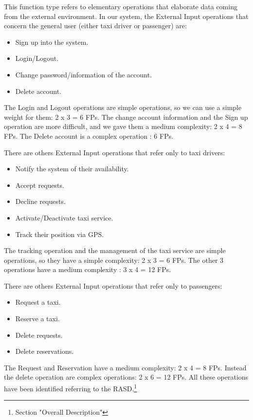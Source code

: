 This function type refers to elementary operations that elaborate data coming from the external environment.
\newline
In our system, the External Input operations that concern the general user (either taxi driver or passenger) are:
\begin{itemize}
    \item Sign up into the system. 
	\item Login/Logout.
	\item Change password/information of the account. 
	\item Delete account. 
\end{itemize}
The Login and Logout operations are simple operations, so we can use a simple weight for them: 2 x 3 = 6 FPs. The change account information and the Sign up operation are more difficult, and we gave them a medium complexity: 2 x 4 = 8 FPs.
The Delete account is a complex operation : 6 FPs.
\newline

There are others External Input operations that refer only to taxi drivers:
\begin{itemize}
	\item Notify the system of their availability. 
	\item Accept requests. 
	\item Decline requests. 
	\item Activate/Deactivate taxi service. 
	\item Track their position via GPS. 
\end{itemize}
The tracking operation and the management of the taxi service are simple operations, so they have a simple complexity: 2 x 3 = 6 FPs.
The other 3 operations have a medium complexity : 3 x 4 = 12 FPs.
\newline

There are others External Input operations that refer only to passengers:
\begin{itemize}
	\item Request a taxi. 
	\item Reserve a taxi. 
	\item Delete requests. 
	\item Delete reservations. 
\end{itemize}
The Request and Reservation have a medium complexity: 2 x 4 = 8 FPs. Instead the delete operation are complex operations: 2 x 6 = 12 FPs.
\newline
All these operations have been identified referring to the RASD.\footnote{Section "Overall Description"}